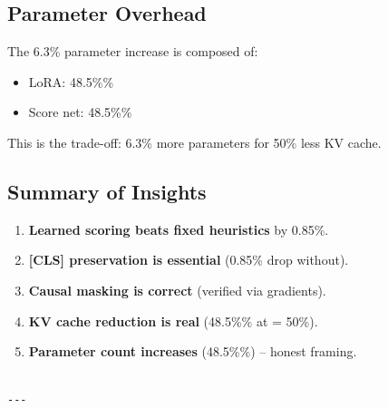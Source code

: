 \subsection{Parameter Overhead}

The 6.3\% parameter increase is composed of:
\begin{itemize}
\item LoRA: 48.5\%\%
\item Score net: 48.5\%\%

\end{itemize}
This is the trade-off: 6.3\% more parameters for 50\% less KV cache.

\subsection{Summary of Insights}

\begin{enumerate}
\item \textbf{Learned scoring beats fixed heuristics} by 0.85\%.
\item \textbf{[CLS] preservation is essential} (0.85\% drop without).
\item \textbf{Causal masking is correct} (verified via gradients).
\item \textbf{KV cache reduction is real} (48.5\%\% at   = 50\%).
\item \textbf{Parameter count increases} (48.5\%\%) -- honest framing.
\end{enumerate}
\begin{lstlisting}

---
\end{lstlisting}